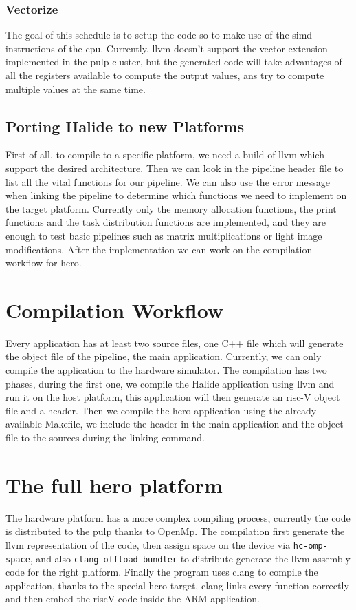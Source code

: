 	\subsubsection{Vectorize}
	The goal of this schedule is to setup the code so to make use of the \gls{simd} instructions of the \gls{cpu}. Currently, llvm doesn't support the vector extension  implemented in the pulp cluster, but the generated code will take advantages of all the registers available to compute the output values, ans try to compute multiple values at the same time.



	\subsection { Porting Halide to new Platforms}
		First of all, to compile to a specific platform, we need a build of llvm which support the desired architecture.
		Then we can look in the pipeline header file to list all the vital functions for our pipeline. We can also use the error message when linking the pipeline to determine which functions we need to implement on the target platform. 
		Currently only the memory allocation functions, the print functions and the task distribution functions are implemented, and they are enough to  test basic pipelines such as matrix multiplications or light image modifications.
	After the implementation we can work on the compilation workflow for hero.

\section{Compilation Workflow}
	Every application has at least two source files, one C++ file which will generate the object file of the pipeline, the main application. 
	Currently, we can only compile the application to the hardware simulator.
	The compilation has two phases, during the first one, we compile the Halide application using llvm and run it on the host platform, this application will then generate an risc-V object file and a header.
	Then we compile the hero application using the already available Makefile, we include the header in the main application and the object file to the sources during the linking command.

		
\section{The full hero platform}
	The hardware platform has a more complex compiling process, currently the code is distributed to the \gls{pulp} thanks to OpenMp. The compilation first generate the llvm representation of the  code, then assign space on the device via \verb|hc-omp-space|, and also \verb|clang-offload-bundler| to distribute generate the llvm assembly code for the right platform. Finally the  program uses clang to compile the application, thanks to the special hero target, clang links every function correctly and then embed the riscV code inside the ARM application.


